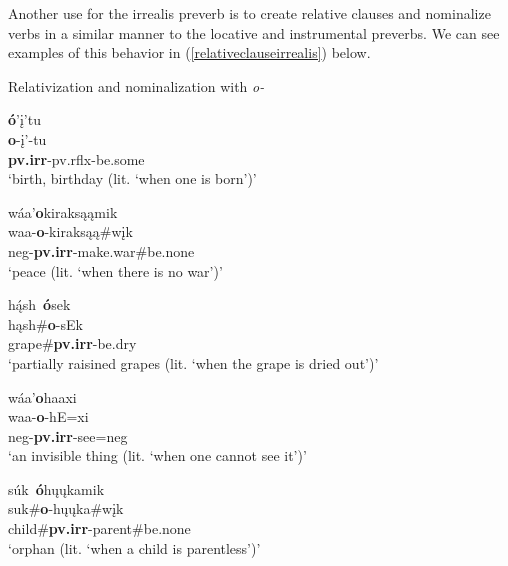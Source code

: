 Another use for the irrealis preverb is to create relative clauses and nominalize verbs in a similar manner to the locative and instrumental preverbs. We can see examples of this behavior in (\ref{relativeclauseirrealis}) below.

\begin{exe}
\item\label{relativeclauseirrealis} Relativization and nominalization with \textit{o-}

	\begin{xlist}
	
	\item \glll \textbf{ó}'į'tu\\
	\textbf{o}-į'-tu\\
	\textbf{pv.irr}-pv.rflx-\textnormal{be.some}\\
	\glt `birth, birthday (lit. `when one is born')' \citep[96]{hollow1970}
	
	
	\item \glll wáa'\textbf{o}kiraksąąmik\\
	waa-\textbf{o}-kiraksąą\#wįk\\
	neg-\textbf{pv.irr}-\textnormal{make.war}\#\textnormal{be.none}\\
	\glt `peace (lit. `when there is no war')' \citep[111]{hollow1970}
	
	\item \glll hą́sh~\textbf{ó}sek\\
	hąsh\#\textbf{o}-sEk\\
	\textnormal{grape}\#\textbf{pv.irr}-\textnormal{be.dry}\\
	\glt `partially raisined grapes (lit. `when the grape is dried out')' \citep[69]{hollow1970}
	
	\item \glll wáa'\textbf{o}haaxi\\
	waa-\textbf{o}-hE=xi\\
	neg-\textbf{pv.irr}-\textnormal{see}=neg\\
	\glt `an invisible thing (lit. `when one cannot see it')' \citep[71]{hollow1970}
	
	\item \glll súk~\textbf{ó}hųųkamik\\
	suk\#\textbf{o}-hųųka\#wįk\\
	\textnormal{child}\#\textbf{pv.irr}-\textnormal{parent}\#\textnormal{be.none}\\
	\glt `orphan (lit. `when a child is parentless')' \citep[83]{hollow1970}
	
	
	\end{xlist}

\end{exe}

